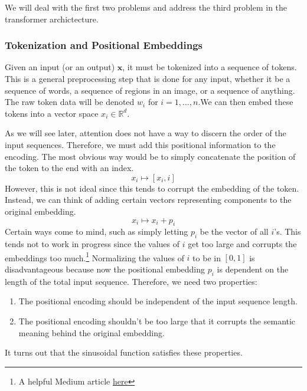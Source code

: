       We will deal with the first two problems and address the third problem in the transformer archictecture. 

    \subsubsection{Tokenization and Positional Embeddings}

      Given an input (or an output) $\mathbf{x}$, it must be tokenized into a sequence of tokens. This is a general preprocessing step that is done for any input, whether it be a sequence of words, a sequence of regions in an image, or a sequence of anything. The raw token data will be denoted $w_i$ for $i = 1, \ldots, n$.We can then embed these tokens into a vector space $x_i \in \mathbb{R}^d$. 

      As we will see later, attention does not have a way to discern the order of the input sequences. Therefore, we must add this positional information to the encoding. The most obvious way would be to simply concatenate the position of the token to the end with an index. 
      \begin{equation} 
        x_i \mapsto [x_i, i]
      \end{equation}
      However, this is not ideal since this tends to corrupt the embedding of the token. Instead, we can think of adding certain vectors representing components to the original embedding. 
      \begin{equation} 
        x_i \mapsto x_i + p_i
      \end{equation}
      Certain ways come to mind, such as simply letting $p_i$ be the vector of all $i$'s. This tends not to work in progress since the values of $i$ get too large and corrupts the embeddings too much.\footnote{A helpful Medium article \href{https://medium.com/@waelrashwan/demystifying-transformer-architecture-the-magic-of-positional-encoding-5fe8154d4a64}{here}} Normalizing the values of $i$ to be in $[0, 1]$ is disadvantageous because now the positional embedding $p_i$ is dependent on the length of the total input sequence. Therefore, we need two properties: 
      \begin{enumerate} 
        \item The positional encoding should be independent of the input sequence length. 
        \item The positional encoding shouldn't be too large that it corrupts the semantic meaning behind the original embedding. 
      \end{enumerate}
      It turns out that the sinusoidal function satisfies these properties. 

